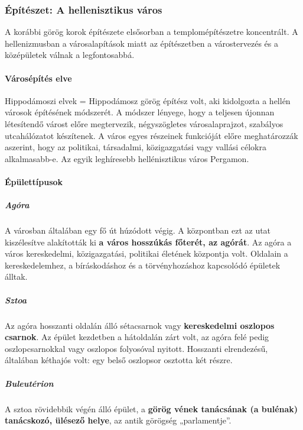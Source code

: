 \subsubsection{Építészet: A hellenisztikus város}

A korábbi görög korok építészete elsősorban a templomépítészetre koncentrált. A hellenizmusban a városalapítások miatt az építészetben a várostervezés és a középületek válnak a legfontosabbá.

\vspace{0.5cm}


\paragraph{Városépítés elve}
Hippodámoszi elvek = Hippodámosz görög építész volt, aki kidolgozta a hellén városok építésének módszerét. A módszer lényege, hogy a teljesen újonnan létesítendő várost előre megtervezik, négyszögletes városalaprajzot, szabályos utcahálózatot készítenek. A város egyes részeinek funkcióját előre meghatározzák aszerint, hogy az politikai, társadalmi, közigazgatási vagy vallási célokra alkalmasabb-e. Az egyik leghíresebb hellénisztikus város Pergamon.

\clearpage

\paragraph{Épülettípusok}

	\subparagraph{Agóra}
	A városban általában egy fő út húzódott végig. A központban ezt az utat kiszélesítve alakították ki \textbf{a város hosszúkás főterét, az agórát}. Az agóra a város kereskedelmi, közigazgatási, politikai életének központja volt. Oldalain a kereskedelemhez, a bíráskodáshoz és a törvényhozáshoz kapcsolódó épületek álltak.
	
	\subparagraph{Sztoa}
	Az agóra hosszanti oldalán álló sétacsarnok vagy \textbf{kereskedelmi oszlopos csarnok}. Az épület kezdetben a hátoldalán zárt volt, az agóra felé pedig oszlopcsarnokkal vagy oszlopos folyosóval nyitott. Hosszanti elrendezésű, általában kéthajós volt: egy belső oszlopsor osztotta két részre.
	
	\subparagraph{Buleutérion}
	A sztoa rövidebbik végén álló épület, a \textbf{görög vének tanácsának (a bulénak) tanácskozó, ülésező helye}, az antik görögség „parlamentje”.
	
